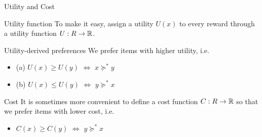 \documentclass[smaller]{beamer}
\begin{document}
\begin{frame}[label={sec:org67bce33}]{Utility and Cost}
\pause
\begin{block}{Utility function}
To make it easy, assign a utility \(U(x)\) to every reward through a
utility function \(U : R \to \mathbb{R}\).
\end{block}

\begin{block}{Utility-derived preferences}
We prefer items with higher utility, i.e.
\begin{itemize}
\item (a) \(U(x) \geq U(y)\) \(\Leftrightarrow\) \(x \succeq^* y\)
\item (b) \(U(x) \leq U(y)\) \(\Leftrightarrow\) \(y \succeq^* x\)
\end{itemize}
\pause
\end{block}
\begin{block}{Cost}
It is sometimes more convenient to define a cost function \(C: R \to \mathbb{R}\) so that we prefer items with lower cost, i.e.
\begin{itemize}
\item \(C(x) \geq C(y)\) \(\Leftrightarrow\) \(y \succeq^* x\)
\end{itemize}
\end{block}
\end{frame}
\end{document}
